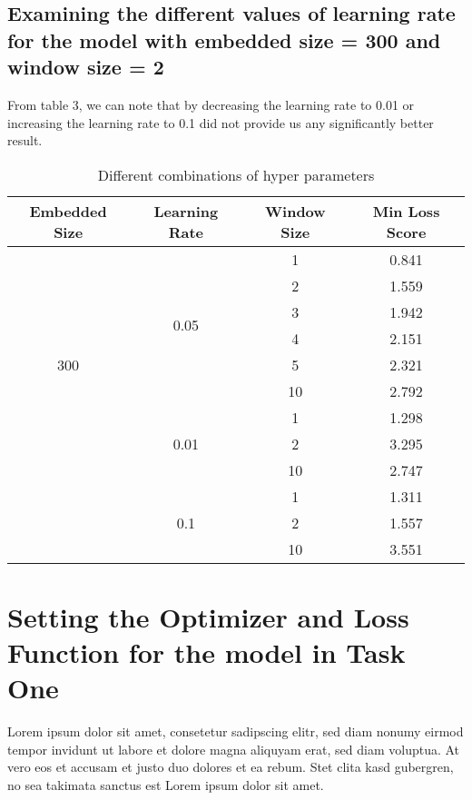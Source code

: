 \documentclass{article}
\begin{document}
\subsection{Examining the different values of learning rate for the model with embedded size = 300 and window size = 2}

From table 3, we can note that by decreasing the learning rate to 0.01 or increasing the learning rate to 0.1 did not provide us any significantly better result.

\begin{table}[b]
\begin{center}
  \caption{Different combinations of hyper parameters}
  \centering
  \begin{tabular}{c|ccc}
    \toprule    
    
    Embedded Size & Learning Rate  & Window Size  & Min Loss Score\\
    \midrule
    \multirow{9}{*}{300} & \multirow{6}{*}{0.05} & 1 & 0.841\\
    & & 2  & 1.559  \\
    & &3 & 1.942 \\
    & &4 & 2.151\\
    & &5  & 2.321\\
    & &10 & 2.792\\
    \cmidrule(r){2-4}
    & \multirow{3}{*}{0.01} & 1 & 1.298 \\
    & & 2 & 3.295 \\
    & & 10 & 2.747 \\
    \cmidrule(r){2-4}
    & \multirow{3}{*}{0.1} & 1 & 1.311 \\
    & & 2 & 1.557 \\
    & & 10 & 3.551 \\

    \bottomrule
  \end{tabular}
\end{center}
\end{table}

\section{Setting the Optimizer and Loss Function for the model in Task One}

Lorem ipsum dolor sit amet, consetetur sadipscing elitr, sed diam nonumy eirmod tempor invidunt ut labore et dolore magna aliquyam erat, sed diam voluptua. At vero eos et accusam et justo duo dolores et ea rebum. Stet clita kasd gubergren, no sea takimata sanctus est Lorem ipsum dolor sit amet.
\end{document}
